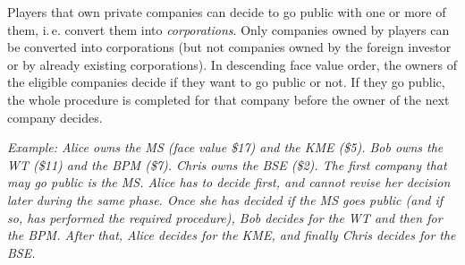 \documentclass[10pt,final]{report}
\begin{document}
\begin{multicols}{2}
Players that own private companies can decide to go public with one or
more of them, i.\,e. convert them into \emph{corporations}. Only
companies owned by players can be converted into corporations (but not
companies owned by the foreign investor or by already existing
corporations). In descending face value order, the owners of the
eligible companies decide if they want to go public or not. If they go
public, the whole procedure is completed for that company before the
owner of the next company decides.

\emph{Example: Alice owns the MS (face value \$17) and the KME
  (\$5). Bob owns the WT (\$11) and the BPM (\$7). Chris owns the BSE
  (\$2). The first company that may go public is the MS. Alice has to
  decide first, and cannot revise her decision later during the same
  phase. Once she has decided if the MS goes public (and if so, has
  performed the required procedure), Bob decides for the WT and then
  for the BPM. After that, Alice decides for the KME, and finally
  Chris decides for the BSE.}


\end{multicols}
\end{document}

